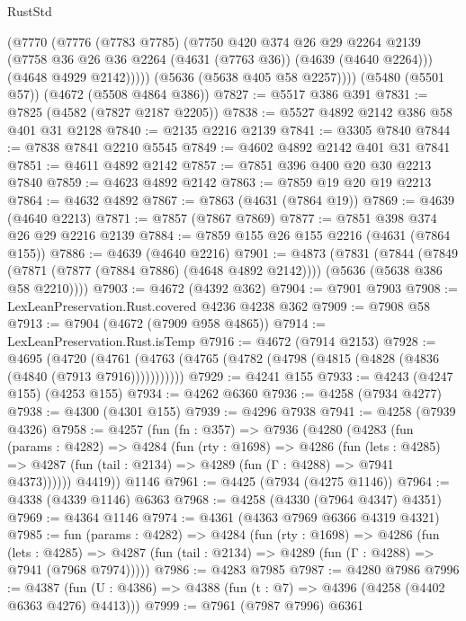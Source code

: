 \begin{lexlean}{RustStd}
\begin{coremodule}
          (@7770
            (@7776
              (@7783 @7785)
              (@7750
                @420
                @374
                @26
                @29
                @2264
                @2139
                (@7758 @36 @26 @36 @2264 (@4631 (@7763 @36)) (@4639 (@4640 @2264)))
                (@4648 @4929 @2142)))))
        (@5636 (@5638 @405 @58 @2257))))
    (@5480 (@5501 @57))
    (@4672 (@5508 @4864 @386))
@7827 := @5517 @386 @391
@7831 := @7825 (@4582 (@7827 @2187 @2205))
@7838 := @5527 @4892 @2142 @386 @58 @401 @31 @2128
@7840 := @2135 @2216 @2139
@7841 := @3305 @7840
@7844 := @7838 @7841 @2210 @5545
@7849 := @4602 @4892 @2142 @401 @31 @7841
@7851 := @4611 @4892 @2142
@7857 := @7851 @396 @400 @20 @30 @2213 @7840
@7859 := @4623 @4892 @2142
@7863 := @7859 @19 @20 @19 @2213
@7864 := @4632 @4892
@7867 := @7863 (@4631 (@7864 @19))
@7869 := @4639 (@4640 @2213)
@7871 := @7857 (@7867 @7869)
@7877 := @7851 @398 @374 @26 @29 @2216 @2139
@7884 := @7859 @155 @26 @155 @2216 (@4631 (@7864 @155))
@7886 := @4639 (@4640 @2216)
@7901 := @4873
    (@7831
      (@7844
        (@7849 (@7871 (@7877 (@7884 @7886) (@4648 @4892 @2142))))
        (@5636 (@5638 @386 @58 @2210))))
@7903 := @4672 (@4392 @362)
@7904 := @7901 @7903
@7908 := LexLeanPreservation.Rust.covered @4236 @4238 @362
@7909 := @7908 @58
@7913 := @7904 (@4672 (@7909 @958 @4865))
@7914 := LexLeanPreservation.Rust.isTemp
@7916 := @4672 (@7914 @2153)
@7928 := @4695
    (@4720 (@4761 (@4763 (@4765 (@4782 (@4798 (@4815 (@4828 (@4836 (@4840 (@7913 @7916)))))))))))
@7929 := @4241 @155
@7933 := @4243 (@4247 @155) (@4253 @155)
@7934 := @4262 @6360
@7936 := @4258 (@7934 @4277)
@7938 := @4300 (@4301 @155)
@7939 := @4296 @7938
@7941 := @4258 (@7939 @4326)
@7958 := @4257
    (fun (fn : @357) =>
    @7936
      (@4280
        (@4283
          (fun (params : @4282) =>
          @4284
            (fun (rty : @1698) =>
            @4286
              (fun (lets : @4285) =>
              @4287 (fun (tail : @2134) => @4289 (fun (Γ : @4288) => @7941 @4373))))))
        @4419))
    @1146
@7961 := @4425 (@7934 (@4275 @1146))
@7964 := @4338 (@4339 @1146) @6363
@7968 := @4258 (@4330 (@7964 @4347) @4351)
@7969 := @4364 @1146
@7974 := @4361 (@4363 @7969 @6366 @4319 @4321)
@7985 := fun (params : @4282) =>
  @4284
    (fun (rty : @1698) =>
    @4286
      (fun (lets : @4285) =>
      @4287 (fun (tail : @2134) => @4289 (fun (Γ : @4288) => @7941 (@7968 @7974)))))
@7986 := @4283 @7985
@7987 := @4280 @7986
@7996 := @4387 (fun (U : @4386) => @4388 (fun (t : @7) => @4396 (@4258 (@4402 @6363 @4276) @4413)))
@7999 := @7961 (@7987 @7996) @6361

\end{coremodule}
\end{lexlean}
